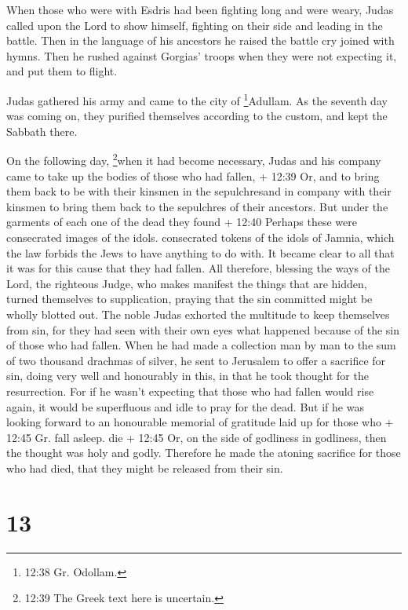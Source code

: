  When those who were with Esdris had been fighting long and
were weary, Judas called upon the Lord to show himself, fighting on
their side and leading in the battle.  Then in the language
of his ancestors he raised the battle cry joined with hymns. Then he
rushed against Gorgias' troops when they were not expecting it, and put
them to flight.

 Judas gathered his army and came to the city of
\footnote{12:38 Gr. Odollam.}Adullam. As the seventh day was coming on,
they purified themselves according to the custom, and kept the Sabbath
there.

 On the following day, \footnote{12:39 The Greek text here
  is uncertain.}when it had become necessary, Judas and his company came
to take up the bodies of those who had fallen, + 12:39 Or, and to bring
them back to be with their kinsmen in the sepulchresand in company with
their kinsmen to bring them back to the sepulchres of their ancestors.
 But under the garments of each one of the dead they found
+ 12:40 Perhaps these were consecrated images of the idols. consecrated
tokens of the idols of Jamnia, which the law forbids the Jews to have
anything to do with. It became clear to all that it was for this cause
that they had fallen.  All therefore, blessing the ways of
the Lord, the righteous Judge, who makes manifest the things that are
hidden,  turned themselves to supplication, praying that
the sin committed might be wholly blotted out. The noble Judas exhorted
the multitude to keep themselves from sin, for they had seen with their
own eyes what happened because of the sin of those who had fallen.
 When he had made a collection man by man to the sum of two
thousand drachmas of silver, he sent to Jerusalem to offer a sacrifice
for sin, doing very well and honourably in this, in that he took thought
for the resurrection.  For if he wasn't expecting that
those who had fallen would rise again, it would be superfluous and idle
to pray for the dead.  But if he was looking forward to an
honourable memorial of gratitude laid up for those who + 12:45 Gr. fall
asleep. die + 12:45 Or, on the side of godliness in godliness, then the
thought was holy and godly. Therefore he made the atoning sacrifice for
those who had died, that they might be released from their sin.

\hypertarget{section-12}{%
\section{13}\label{section-12}}

